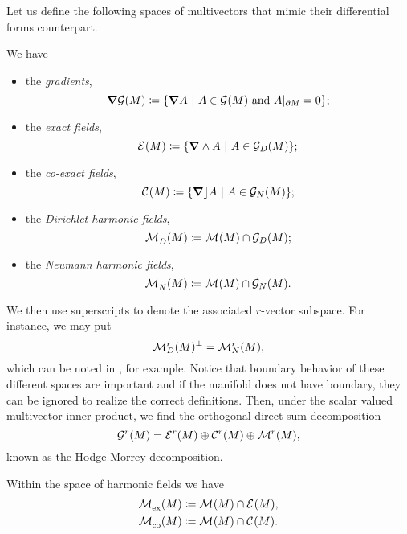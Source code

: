 Let us define the following spaces of multivectors that mimic their differential forms counterpart.
\begin{definition}
\label{def:differential_spaces}
We have
\begin{itemize}
    \item the \emph{gradients},
    \begin{equation}
    \boldsymbol{\nabla} \mathcal{G}(M) \coloneqq \{ \boldsymbol{\nabla} A ~\vert~ A \in \mathcal{G}(M) \textrm{~and~} A\vert_{\partial M} = 0\};
    \end{equation}
    \item the \emph{exact fields},
    \begin{equation}
        \mathcal{E}^{}(M)\coloneqq \{\boldsymbol{\nabla} \wedge A ~\vert~ A \in \mathcal{G}_D(M)\};
    \end{equation}
    \item the \emph{co-exact fields},
    \begin{equation}
        \mathcal{C}^{}(M)\coloneqq \{\boldsymbol{\nabla} \rfloor A ~\vert~ A \in \mathcal{G}_N(M)\};
    \end{equation}
    \item the \emph{Dirichlet harmonic fields},
    \begin{equation}
        \mathcal{M}^{}_D(M)\coloneqq \mathcal{M}^{}(M) \cap \mathcal{G}_D(M);
    \end{equation}
    \item the \emph{Neumann harmonic fields},
    \begin{equation}
        \mathcal{M}^{}_N(M)\coloneqq \mathcal{M}^{}(M) \cap \mathcal{G}_N(M).
    \end{equation}
\end{itemize}
\end{definition}
We then use superscripts to denote the associated $r$-vector subspace. For instance, we may put
\begin{equation}
\mathcal{M}^{r}_D(M)^\perp = \mathcal{M}^{r}_N(M),
\end{equation}
which can be noted in \cite{belishev_dirichlet_2008}, for example. Notice that boundary behavior of these different spaces are important and if the manifold does not have boundary, they can be ignored to realize the correct definitions. Then, under the scalar valued multivector inner product, we find the orthogonal direct sum decomposition
\begin{equation}
\mathcal{G}^r(M) = \mathcal{E}^{r}(M) \oplus \mathcal{C}^{r}(M) \oplus \mathcal{M}^{r}(M),
\end{equation}
known as the Hodge-Morrey decomposition.
\begin{definition}
Within the space of harmonic fields we have
\begin{align}
    \mathcal{M}^{}_{\textrm{ex}}(M) &\coloneqq \mathcal{M}^{}(M)\cap \mathcal{E}^{}(M),\\
    \mathcal{M}^{}_{\textrm{co}}(M) &\coloneqq \mathcal{M}^{}(M) \cap \mathcal{C}^{}(M).
\end{align}
\end{definition}
